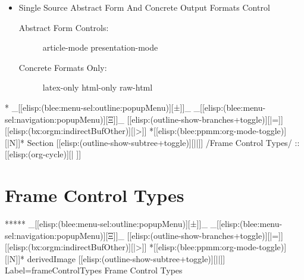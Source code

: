 \begin{whenOrg}
\begin{verblatex}
\begin{frame}[fragile,plain,label=UnifiedSourceControllingAllResults]
    \begin{itemize}
    \item Single Source Abstract Form And Concrete Output Formats Control
      \begin{description}
      \item[Abstract Form Controls:] article-mode presentation-mode
      \item[Concrete Formats Only:] latex-only html-only raw-html
      \end{description}
    \end{itemize}




\end{frame}
\end{verblatex}


\begin{whenOrg}
*  _[[elisp:(blee:menu-sel:outline:popupMenu)][±]]_ _[[elisp:(blee:menu-sel:navigation:popupMenu)][Ξ]]_ [[elisp:(outline-show-branches+toggle)][|=]] [[elisp:(bx:orgm:indirectBufOther)][|>]] *[[elisp:(blee:ppmm:org-mode-toggle)][|N]]*  Section    [[elisp:(outline-show-subtree+toggle)][||]]   /Frame Control Types/ ::  [[elisp:(org-cycle)][| ]]
\end{whenOrg}

\section{Frame Control Types}


\begin{whenOrg}
*****  _[[elisp:(blee:menu-sel:outline:popupMenu)][±]]_ _[[elisp:(blee:menu-sel:navigation:popupMenu)][Ξ]]_ [[elisp:(outline-show-branches+toggle)][|=]] [[elisp:(bx:orgm:indirectBufOther)][|>]] *[[elisp:(blee:ppmm:org-mode-toggle)][|N]]*  derivedImage [[elisp:(outline-show-subtree+toggle)][||]] Label=frameControlTypes Frame Control Types
\end{whenOrg}


\end{whenOrg}
